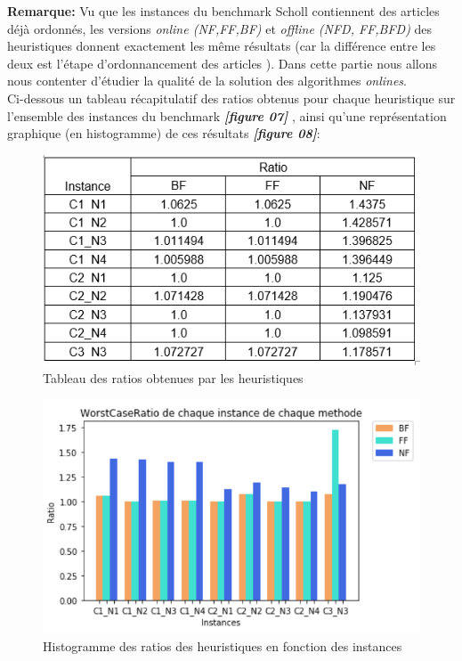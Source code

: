 \documentclass[class=article, crop=false]{standalone}
\begin{document}
\textbf{Remarque:} 
Vu que les instances du benchmark Scholl contiennent des articles déjà ordonnés, les versions \emph{online (NF,FF,BF)} et \emph{offline (NFD, \emph{FF},BFD)} des heuristiques donnent exactement les même résultats (car la différence entre les deux est l’étape d’ordonnancement des articles ). Dans cette partie nous allons nous contenter d’étudier la qualité de la solution des algorithmes \emph{onlines}.\\

Ci-dessous un tableau récapitulatif des ratios obtenus pour chaque heuristique sur l’ensemble des instances du benchmark \textbf{\emph{[figure 07]}} , ainsi qu’une représentation graphique (en histogramme) de ces résultats \textbf{\emph{[figure 08]}}:

\begin{figure}[H]
    \includegraphics[width=\linewidth]{../figures/tab_ratio_heur.png}
    \caption{Tableau des ratios obtenues par les heuristiques}
\end{figure}

\begin{figure}[H] 
    \includegraphics[width=\linewidth]{../figures/Ratio_M_heuristiques_intances.png}
    \caption{Histogramme des ratios des heuristiques en fonction des instances}
\end{figure}
\end{document}
